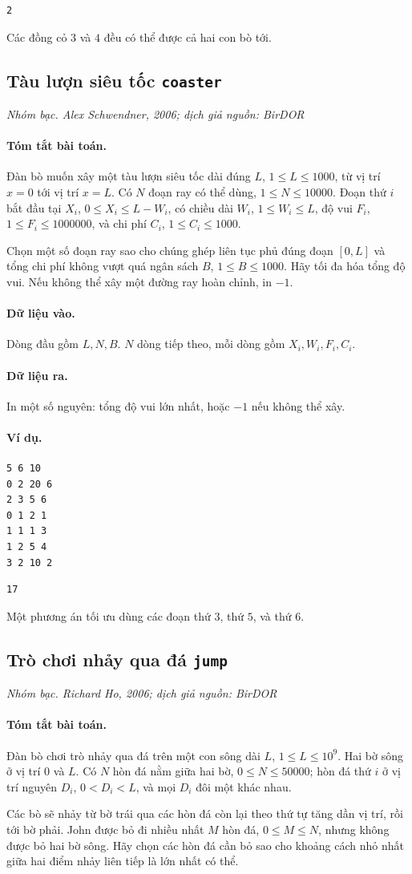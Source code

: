 \documentclass[11pt]{article}
\newcommand{\problem}[4]{%
  \subsection[#1 (#2)]{#1 \hfill {\normalsize\texttt{#2}}}%
  \noindent\textit{#3. #4}\par\smallskip
}
\newcommand{\iosec}[1]{\paragraph{#1}}
\begin{document}
\begin{verbatim}
2
\end{verbatim}

Các đồng cỏ \(3\) và \(4\) đều có thể được cả hai con bò tới.

\problem{Tàu lượn siêu tốc}{coaster}{Nhóm bạc}{Alex Schwendner, 2006; dịch giả nguồn: BirDOR}

\iosec{Tóm tắt bài toán.}
Đàn bò muốn xây một tàu lượn siêu tốc dài đúng \(L\),
\(1\le L\le 1000\), từ vị trí \(x=0\) tới vị trí \(x=L\). Có \(N\) đoạn ray
có thể dùng, \(1\le N\le 10000\). Đoạn thứ \(i\) bắt đầu tại \(X_i\),
\(0\le X_i\le L-W_i\), có chiều dài \(W_i\), \(1\le W_i\le L\), độ vui
\(F_i\), \(1\le F_i\le 1000000\), và chi phí \(C_i\), \(1\le C_i\le 1000\).

Chọn một số đoạn ray sao cho chúng ghép liên tục phủ đúng đoạn \([0,L]\) và
tổng chi phí không vượt quá ngân sách \(B\), \(1\le B\le 1000\). Hãy tối đa
hóa tổng độ vui. Nếu không thể xây một đường ray hoàn chỉnh, in \(-1\).

\iosec{Dữ liệu vào.}
Dòng đầu gồm \(L,N,B\). \(N\) dòng tiếp theo, mỗi dòng gồm
\(X_i,W_i,F_i,C_i\).

\iosec{Dữ liệu ra.}
In một số nguyên: tổng độ vui lớn nhất, hoặc \(-1\) nếu không thể xây.

\iosec{Ví dụ.}
\begin{verbatim}
5 6 10
0 2 20 6
2 3 5 6
0 1 2 1
1 1 1 3
1 2 5 4
3 2 10 2
\end{verbatim}

\begin{verbatim}
17
\end{verbatim}

Một phương án tối ưu dùng các đoạn thứ \(3\), thứ \(5\), và thứ \(6\).

\problem{Trò chơi nhảy qua đá}{jump}{Nhóm bạc}{Richard Ho, 2006; dịch giả nguồn: BirDOR}

\iosec{Tóm tắt bài toán.}
Đàn bò chơi trò nhảy qua đá trên một con sông dài \(L\),
\(1\le L\le 10^9\). Hai bờ sông ở vị trí \(0\) và \(L\). Có \(N\) hòn đá nằm
giữa hai bờ, \(0\le N\le 50000\); hòn đá thứ \(i\) ở vị trí nguyên
\(D_i\), \(0<D_i<L\), và mọi \(D_i\) đôi một khác nhau.

Các bò sẽ nhảy từ bờ trái qua các hòn đá còn lại theo thứ tự tăng dần vị trí,
rồi tới bờ phải. John được bỏ đi nhiều nhất \(M\) hòn đá,
\(0\le M\le N\), nhưng không được bỏ hai bờ sông. Hãy chọn các hòn đá cần bỏ
sao cho khoảng cách nhỏ nhất giữa hai điểm nhảy liên tiếp là lớn nhất có thể.
\end{document}
